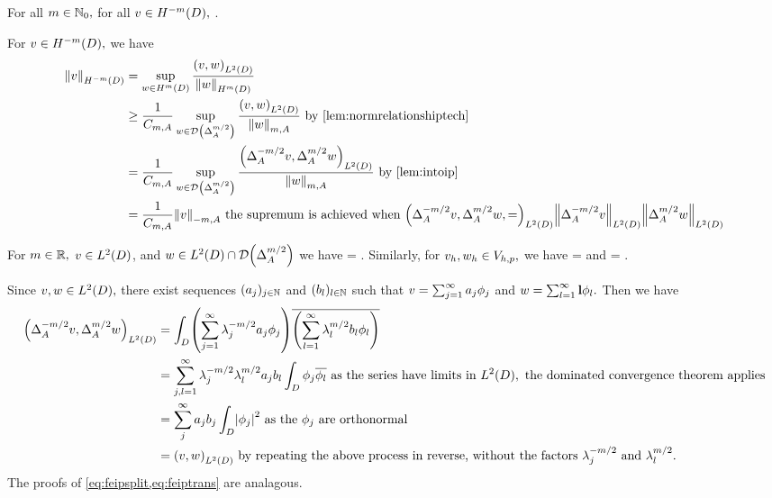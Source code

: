 \label{lem:normrelationship}
For all $m \in \mathbb N_{0},$ for all $v \in \HmmD,$
\beqs
{} \geq {} .
\eeqs
\ele

For $v \in \HmmD,$ we have
\begin{align*}
\NHmmD{v} &= \sup_{w \in \HmD} \frac{\IPLtD{v}{w}}{\NHmD{w}}\\
&\geq \frac1{\Cma} \sup_{w \in \Domain{\DeltaA^{m/2}}} \frac{\IPLtD{v}{w}}{\NmA{w}} \text{ by \cref{lem:normrelationshiptech}}\\
& = \frac1{\Cma} \sup_{w \in \Domain{\DeltaA^{m/2}}} \frac{\IPLtD{\DeltaA^{-m/2}v}{\DeltaA^{m/2}w}}{\NmA{w}} \text{ by \cref{lem:intoip}}\\
&= \frac1{\Cma} \NmmA{v} \text{ the supremum is achieved when } \IPLtD{\DeltaA^{-m/2}v,\DeltaA^{m/2}w} = \NLtD{\DeltaA^{-m/2}v}\NLtD{\DeltaA^{m/2}w}
\end{align*}
\epf

\label{lem:intoip}
For $m \in \mathbb R,$ $v \in \LtD$, and $w \in \LtD\cap\Domain{\DeltaA^{m/2}}$ we have
\beqs
{} = .
\eeqs
Similarly, for $v_{h}, w_{h} \in V_{h,p},$ we have
\beq\label{eq:feipsplit}
\IPLtD{\Deltahmmt \vh}{\Deltahmt \wh} = \IPLtD{\vh}{\wh}
\eeq
and
\beq\label{eq:feiptrans}
\IPLtD{\Deltahmt \vh}{\Deltahmt \vh} =  .
\eeq
\ele

Since $v,w \in \LtD,$ there exist sequences $(a_{j})_{j \in \mathbb N}$ and $(b_{l})_{l \in \mathbb N}$ such that $v = \sum_{j=1}^\infty a_{j}\phi_{j}$ and $w = \sum_{l=1}^\infty \mathbf{l} \phi_{l}.$ Then we have
\begin{align*}
\IPLtD{\DeltaAmmt v}{\DeltaAmt w} &= \int_D \mleft(\sum_{j=1}^\infty\lambdaj^{-m/2} \aj\phij\mright)\overline{\mleft(\sum_{l=1}^\infty \lambdal^{m/2}\bsl \phil\mright)}\\
&= \sum_{j,l=1}^\infty \lambdaj^{-m/2} \lambdal^{m/2} \aj \bsl \int_D \phij \philbar \text{ as the series have limits in } \LtD, \text{ the dominated convergence theorem applies}\\
& =\sum_{j}^\infty \aj \bsj \int_D \abs{\phij}^2 \text{ as the } \phij \text{ are orthonormal}\\
&= \IPLtD{v}{w} \text{ by repeating the above process in reverse, without the factors } \lambdaj^{-m/2} \tand \lambdal^{m/2}.
\end{align*}
The proofs of \cref{eq:feipsplit,eq:feiptrans} are analagous.
\epf

